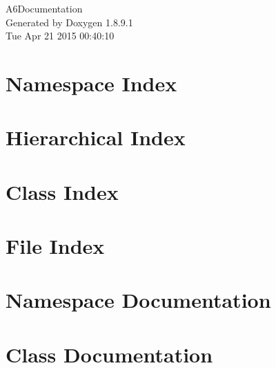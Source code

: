 \documentclass[twoside]{book}
\newcommand{\+}{\discretionary{\mbox{\scriptsize$\hookleftarrow$}}{}{}}
\newcommand{\clearemptydoublepage}{%
  \newpage{\pagestyle{empty}\cleardoublepage}%
}
\begin{document}
\hypersetup{pageanchor=false,
             bookmarks=true,
             bookmarksnumbered=true,
             pdfencoding=unicode
            }
\begin{titlepage}
\vspace*{7cm}
\begin{center}%
{\Large A6\+Documentation }\\
\vspace*{1cm}
{\large Generated by Doxygen 1.8.9.1}\\
\vspace*{0.5cm}
{\small Tue Apr 21 2015 00:40:10}\\
\end{center}
\end{titlepage}
\clearemptydoublepage
\tableofcontents
\clearemptydoublepage
{}
\hypersetup{pageanchor=true}

\chapter{Namespace Index}

\chapter{Hierarchical Index}

\chapter{Class Index}

\chapter{File Index}

\chapter{Namespace Documentation}






\chapter{Class Documentation}






















\end{document}
